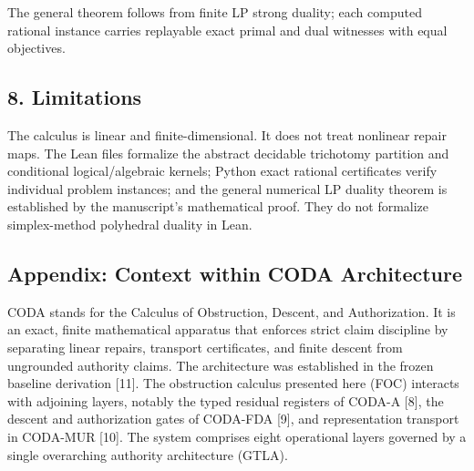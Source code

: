 \documentclass[
  11pt,
]{article}
\begin{document}
The general theorem follows from finite LP strong duality; each computed rational instance carries replayable exact primal and dual witnesses with equal objectives.

\subsection{8. Limitations}\label{limitations}

The calculus is linear and finite-dimensional. It does not treat nonlinear repair maps. The Lean files formalize the abstract decidable trichotomy partition and conditional logical/algebraic kernels; Python exact rational certificates verify individual problem instances; and the general numerical LP duality theorem is established by the manuscript's mathematical proof. They do not formalize simplex-method polyhedral duality in Lean.

\subsection{Appendix: Context within CODA Architecture}\label{appendix-context-within-coda-architecture}

CODA stands for the Calculus of Obstruction, Descent, and Authorization. It is an exact, finite mathematical apparatus that enforces strict claim discipline by separating linear repairs, transport certificates, and finite descent from ungrounded authority claims. The architecture was established in the frozen baseline derivation {[}11{]}. The obstruction calculus presented here (FOC) interacts with adjoining layers, notably the typed residual registers of CODA-A {[}8{]}, the descent and authorization gates of CODA-FDA {[}9{]}, and representation transport in CODA-MUR {[}10{]}. The system comprises eight operational layers governed by a single overarching authority architecture (GTLA).
\end{document}
